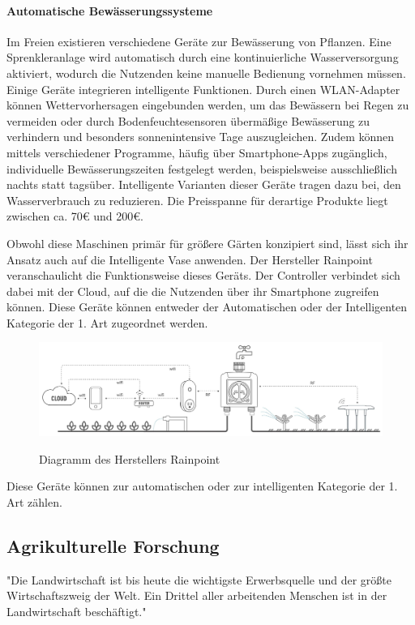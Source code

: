 \paragraph{Automatische Bewässerungssysteme}
Im Freien existieren verschiedene Geräte zur Bewässerung von Pflanzen. Eine Sprenkleranlage wird automatisch durch eine kontinuierliche Wasserversorgung aktiviert, wodurch die Nutzenden keine manuelle Bedienung vornehmen müssen. Einige Geräte integrieren intelligente Funktionen. Durch einen WLAN-Adapter können Wettervorhersagen eingebunden werden, um das Bewässern bei Regen zu vermeiden oder durch Bodenfeuchtesensoren übermäßige Bewässerung zu verhindern und besonders sonnenintensive Tage auszugleichen. Zudem können mittels verschiedener Programme, häufig über Smartphone-Apps zugänglich, individuelle Bewässerungszeiten festgelegt werden, beispielsweise ausschließlich nachts statt tagsüber. Intelligente Varianten dieser Geräte tragen dazu bei, den Wasserverbrauch zu reduzieren. Die Preisspanne für derartige Produkte liegt zwischen ca. 70€ und 200€.\cite{rainpoint_smart_timer} 

Obwohl diese Maschinen primär für größere Gärten konzipiert sind, lässt sich ihr Ansatz auch auf die Intelligente Vase anwenden. Der Hersteller Rainpoint veranschaulicht die Funktionsweise dieses Geräts. Der Controller verbindet sich dabei mit der Cloud, auf die die Nutzenden über ihr Smartphone zugreifen können. Diese Geräte können entweder der Automatischen oder der Intelligenten Kategorie der 1. Art zugeordnet werden.

\begin{figure}[H]
\centering
\includegraphics[width=\textwidth]{images/rainpoint.jpg}
\caption{Diagramm des Herstellers Rainpoint}\cite{rainpoint_smart_timer}
\label{fig:rainpointDiagram}
\end{figure}

Diese Geräte können zur automatischen oder zur intelligenten Kategorie der 1. Art zählen.

\subsection{Agrikulturelle Forschung}
"Die Landwirtschaft ist bis heute die wichtigste Erwerbsquelle und der größte Wirtschaftszweig der Welt. Ein Drittel aller arbeitenden Menschen ist in der Landwirtschaft beschäftigt."\cite{zukunftsstiftung_landwirtschaft}

